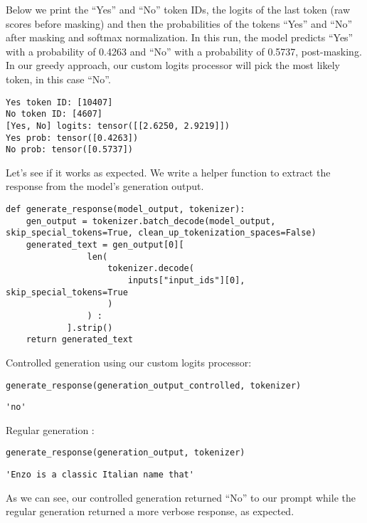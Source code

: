Below we print the ``Yes'' and ``No'' token IDs, the logits of the last token (raw scores before masking) and then the probabilities of the tokens ``Yes'' and ``No'' after masking and softmax normalization. In this run, the model predicts ``Yes'' with a probability of 0.4263 and ``No'' with a probability of 0.5737, post-masking. In our greedy approach, our custom logits processor will pick the most likely token, in this case ``No''.

\begin{verbatim}
Yes token ID: [10407]
No token ID: [4607]
[Yes, No] logits: tensor([[2.6250, 2.9219]])
Yes prob: tensor([0.4263])
No prob: tensor([0.5737])
\end{verbatim}

Let's see if it works as expected. We write a helper function to extract the response from the model's generation output.

\begin{verbatim}
def generate_response(model_output, tokenizer):
    gen_output = tokenizer.batch_decode(model_output, skip_special_tokens=True, clean_up_tokenization_spaces=False)
    generated_text = gen_output[0][
                len(
                    tokenizer.decode(
                        inputs["input_ids"][0], skip_special_tokens=True
                    )
                ) :
            ].strip()
    return generated_text
\end{verbatim}

Controlled generation using our custom logits processor:

\begin{verbatim}
generate_response(generation_output_controlled, tokenizer)
\end{verbatim}

\begin{verbatim}
'no'
\end{verbatim}

Regular generation :

\begin{verbatim}
generate_response(generation_output, tokenizer)
\end{verbatim}

\begin{verbatim}
'Enzo is a classic Italian name that'
\end{verbatim}

As we can see, our controlled generation returned ``No'' to our prompt while the regular generation returned a more verbose response, as expected.

